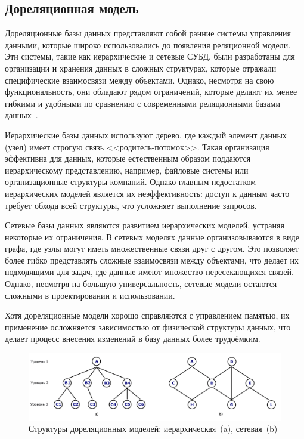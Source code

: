 \subsection{Дореляционная модель}

Дореляционные базы данных представляют собой ранние системы управления данными, которые широко использовались до появления реляционной модели. Эти системы, такие как иерархические и сетевые СУБД, были разработаны для организации и хранения данных в сложных структурах, которые отражали специфические взаимосвязи между объектами. Однако, несмотря на свою функциональность, они обладают рядом ограничений, которые делают их менее гибкими и удобными по сравнению с современными реляционными базами данных~\cite{lit7}.

Иерархические базы данных используют дерево, где каждый элемент данных (узел) имеет строгую связь <<родитель-потомок>>. Такая организация эффективна для данных, которые естественным образом поддаются иерархическому представлению, например, файловые системы или организационные структуры компаний. Однако главным недостатком иерархических моделей является их неэффективность: доступ к данным часто требует обхода всей структуры, что усложняет выполнение запросов.

Сетевые базы данных являются развитием иерархических моделей, устраняя некоторые их ограничения. В сетевых моделях данные организовываются в виде графа, где узлы могут иметь множественные связи друг с другом. Это позволяет более гибко представлять сложные взаимосвязи между объектами, что делает их подходящими для задач, где данные имеют множество пересекающихся связей. Однако, несмотря на большую универсальность, сетевые модели остаются сложными в проектировании и использовании.

Хотя дореляционные модели хорошо справляются с управлением памятью, их применение осложняется зависимостью от физической структуры данных, что делает процесс внесения изменений в базу данных более трудоёмким.

\newpage

\begin{figure}[h]
	\centering
	\includegraphics[width=1\textwidth]{images/prerelational-model.png}
	\caption{Структуры дореляционных моделей: иерархическая~(a), сетевая~(b)} 
	\label{fig:hierarchy-model} 
\end{figure}

